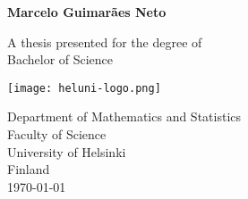 \begin{titlepage}
    \begin{center}
            
        \Huge
        \textbf{\thtitle}
            
        \vspace{0.5cm}
        \LARGE
        \thsubtitle  

        \vspace{1.5cm}
            
        \textbf{Marcelo Guimarães Neto}
            
        \vfill
            
        A thesis presented for the degree of\\
        Bachelor of Science
            
        \vspace{0.8cm}
            
        \texttt{[image: heluni-logo.png]}
        
        \vspace{0.8cm}
            
        \Large
        Department of Mathematics and Statistics\\
        Faculty of Science\\
        University of Helsinki\\
        Finland\\
        \today
            
    \end{center}
\end{titlepage}
